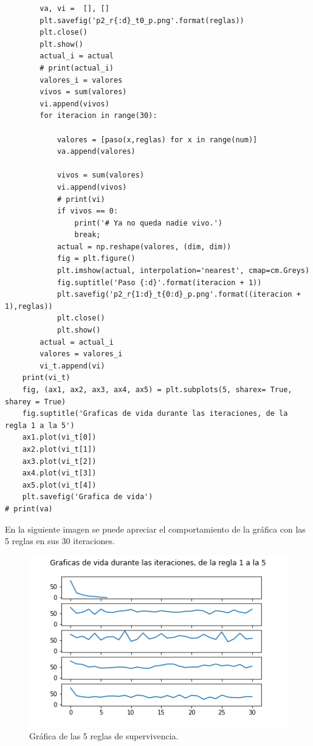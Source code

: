 \documentclass{article}
\begin{document}
\begin{verbatim}
        va, vi =  [], []
        plt.savefig('p2_r{:d}_t0_p.png'.format(reglas))
        plt.close()
        plt.show()
        actual_i = actual
        # print(actual_i)
        valores_i = valores
        vivos = sum(valores)
        vi.append(vivos)
        for iteracion in range(30):
            
            valores = [paso(x,reglas) for x in range(num)]
            va.append(valores)
            
            vivos = sum(valores)
            vi.append(vivos)
            # print(vi)
            if vivos == 0:
                print('# Ya no queda nadie vivo.')
                break;
            actual = np.reshape(valores, (dim, dim))
            fig = plt.figure()
            plt.imshow(actual, interpolation='nearest', cmap=cm.Greys)
            fig.suptitle('Paso {:d}'.format(iteracion + 1))
            plt.savefig('p2_r{1:d}_t{0:d}_p.png'.format((iteracion + 1),reglas))
            plt.close()
            plt.show()
        actual = actual_i
        valores = valores_i
        vi_t.append(vi)
    print(vi_t)
    fig, (ax1, ax2, ax3, ax4, ax5) = plt.subplots(5, sharex= True, sharey = True)
    fig.suptitle('Graficas de vida durante las iteraciones, de la regla 1 a la 5')
    ax1.plot(vi_t[0])
    ax2.plot(vi_t[1])
    ax3.plot(vi_t[2])
    ax4.plot(vi_t[3])
    ax5.plot(vi_t[4])
    plt.savefig('Grafica de vida')
# print(va)

\end{verbatim}
\newpage
En la siguiente imagen se puede apreciar el comportamiento de la gráfica con las 5 reglas en sus 30 iteraciones.

\begin{figure}[H]
\centering
\includegraphics[width=120mm]{Grafica de vida.png}
\caption{\label{fig1}Gráfica de las 5 reglas de supervivencia.}
\end{figure}
\end{document}
